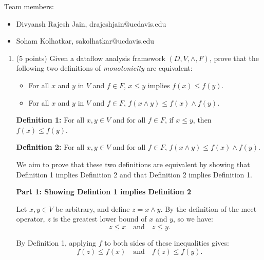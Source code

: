 \documentclass[12pt]{article}
\begin{document}
    \begin{mdframed}
      Team members:
      \begin{itemize}
        \item Divyansh Rajesh Jain, drajeshjain@ucdavis.edu %
        \item Soham Kolhatkar, sakolhatkar@ucdavis.edu %
      \end{itemize}
    \end{mdframed}

    \begin{enumerate}


            
        \item (5 points) Given a dataflow analysis framework $(D, V, \wedge, F)$,
        prove that the following two definitions of \emph{monotonicity} are equivalent:
        \begin{itemize}
          \item For all $x$ and $y$ in $V$ and $f \in F$, $x \leq y$ implies $f(x) \leq f(y)$.
          \item For all $x$ and $y$ in $V$ and $f \in F$, $f(x \wedge y) \leq f(x) \wedge f(y)$.
        \end{itemize}

        \begin{mdframed}
          \textbf{Definition 1:} For all $x, y \in V$ and for all $f \in F$, if $x \leq y$, then $f(x) \leq f(y)$.

          \medskip

          \textbf{Definition 2:} For all $x, y \in V$ and for all $f \in F$, $f(x \wedge y) \leq f(x) \wedge f(y)$.

          \medskip

          We aim to prove that these two definitions are equivalent by showing that Definition 1 implies Definition 2 and that Definition 2 implies Definition 1.

          \medskip

          \textbf{Part 1: Showing Defintion 1 implies Definition 2}

          Let $x, y \in V$ be arbitrary, and define $z = x \wedge y$. By the definition of the meet operator, $z$ is the greatest lower bound of $x$ and $y$, so we have:
          \[
          z \leq x \quad \text{and} \quad z \leq y.
          \]

          By Definition 1, applying $f$ to both sides of these inequalities gives:
          \[
          f(z) \leq f(x) \quad \text{and} \quad f(z) \leq f(y).
          \]


\end{mdframed}
\end{enumerate}
\end{document}
